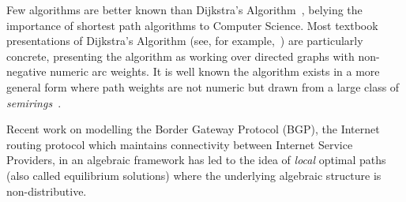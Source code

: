 Few algorithms are better known than Dijkstra's Algorithm~\cite{dijkstra:note:1959}, belying the importance of shortest path algorithms to Computer Science.
Most textbook presentations of Dijkstra's Algorithm (see, for example,~\cite[Chapter 24]{clrs}) are particularly concrete, presenting the algorithm as working over directed graphs with non-negative numeric arc weights.
It is well known the algorithm exists in a more general form where path weights are not numeric but drawn from a large class of \emph{semirings}~\cite{gondran_graphs_2008, mohri:semiring:2002}.

Recent work on modelling the Border Gateway Protocol (BGP), the Internet routing protocol which maintains connectivity between Internet Service Providers, in an algebraic framework has led to the idea of \emph{local} optimal paths (also called equilibrium solutions) where the underlying algebraic structure is non-distributive.

